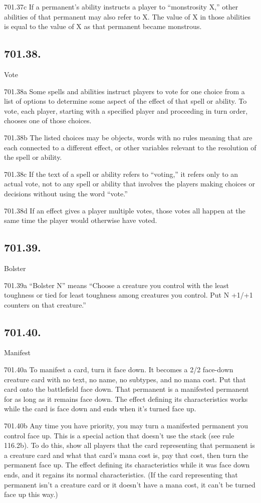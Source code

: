 701.37c If a permanent’s ability instructs a player to “monstrosity X,” other abilities of that permanent may also refer to X. The value of X in those abilities is equal to the value of X as that permanent became monstrous.

\subsection*{701.38.}
Vote

701.38a Some spells and abilities instruct players to vote for one choice from a list of options to determine some aspect of the effect of that spell or ability. To vote, each player, starting with a specified player and proceeding in turn order, chooses one of those choices.

701.38b The listed choices may be objects, words with no rules meaning that are each connected to a different effect, or other variables relevant to the resolution of the spell or ability.

701.38c If the text of a spell or ability refers to “voting,” it refers only to an actual vote, not to any spell or ability that involves the players making choices or decisions without using the word “vote.”

701.38d If an effect gives a player multiple votes, those votes all happen at the same time the player would otherwise have voted.

\subsection*{701.39.}
Bolster

701.39a “Bolster N” means “Choose a creature you control with the least toughness or tied for least toughness among creatures you control. Put N +1/+1 counters on that creature.”

\subsection*{701.40.}
Manifest

701.40a To manifest a card, turn it face down. It becomes a 2/2 face-down creature card with no text, no name, no subtypes, and no mana cost. Put that card onto the battlefield face down. That permanent is a manifested permanent for as long as it remains face down. The effect defining its characteristics works while the card is face down and ends when it’s turned face up.

701.40b Any time you have priority, you may turn a manifested permanent you control face up. This is a special action that doesn’t use the stack (see rule 116.2b). To do this, show all players that the card representing that permanent is a creature card and what that card’s mana cost is, pay that cost, then turn the permanent face up. The effect defining its characteristics while it was face down ends, and it regains its normal characteristics. (If the card representing that permanent isn’t a creature card or it doesn’t have a mana cost, it can’t be turned face up this way.)


